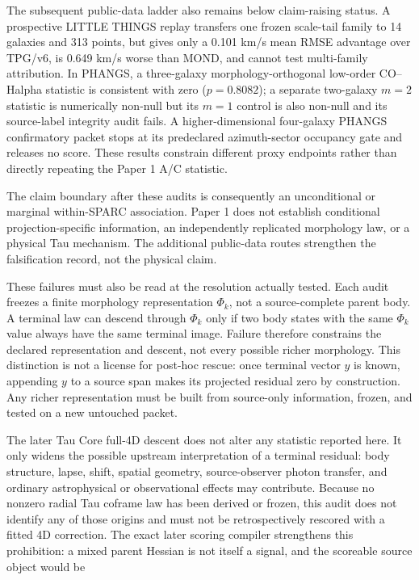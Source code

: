 \documentclass[11pt]{article}
\begin{document}
The subsequent public-data ladder also remains below claim-raising status. A prospective LITTLE THINGS replay transfers one frozen scale-tail family to 14 galaxies and 313 points, but gives only a 0.101 km/s mean RMSE advantage over TPG/v6, is 0.649 km/s worse than MOND, and cannot test multi-family attribution. In PHANGS, a three-galaxy morphology-orthogonal low-order CO--Halpha statistic is consistent with zero ($p = 0.8082$); a separate two-galaxy $m=2$ statistic is numerically non-null but its $m=1$ control is also non-null and its source-label integrity audit fails. A higher-dimensional four-galaxy PHANGS confirmatory packet stops at its predeclared azimuth-sector occupancy gate and releases no score. These results constrain different proxy endpoints rather than directly repeating the Paper 1 A/C statistic.

The claim boundary after these audits is consequently an unconditional or marginal within-SPARC association. Paper 1 does not establish conditional projection-specific information, an independently replicated morphology law, or a physical Tau mechanism. The additional public-data routes strengthen the falsification record, not the physical claim.

These failures must also be read at the resolution actually tested. Each audit freezes a finite morphology representation $\Phi_k$, not a source-complete parent body. A terminal law can descend through $\Phi_k$ only if two body states with the same $\Phi_k$ value always have the same terminal image. Failure therefore constrains the declared representation and descent, not every possible richer morphology. This distinction is not a license for post-hoc rescue: once terminal vector $y$ is known, appending $y$ to a source span makes its projected residual zero by construction. Any richer representation must be built from source-only information, frozen, and tested on a new untouched packet.

The later Tau Core full-4D descent does not alter any statistic reported here. It only widens the possible upstream interpretation of a terminal residual: body structure, lapse, shift, spatial geometry, source-observer photon transfer, and ordinary astrophysical or observational effects may contribute. Because no nonzero radial Tau coframe law has been derived or frozen, this audit does not identify any of those origins and must not be retrospectively rescored with a fitted 4D correction. The exact later scoring compiler strengthens this prohibition: a mixed parent Hessian is not itself a signal, and the scoreable source object would be
\end{document}
